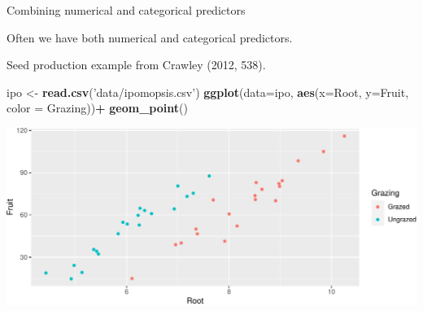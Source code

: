 \documentclass[
  ignorenonframetext,
]{beamer}
\newenvironment{Shaded}{\begin{snugshade}}{\end{snugshade}}
\newcommand{\DataTypeTok}[1]{\textcolor[rgb]{0.13,0.29,0.53}{#1}}
\newcommand{\KeywordTok}[1]{\textcolor[rgb]{0.13,0.29,0.53}{\textbf{#1}}}
\newcommand{\NormalTok}[1]{#1}
\newcommand{\OperatorTok}[1]{\textcolor[rgb]{0.81,0.36,0.00}{\textbf{#1}}}
\newcommand{\StringTok}[1]{\textcolor[rgb]{0.31,0.60,0.02}{#1}}
\begin{document}
\begin{frame}[fragile]{Combining numerical and categorical predictors}
\protect\hypertarget{combining-numerical-and-categorical-predictors}{}

Often we have both numerical and categorical predictors.

Seed production example from Crawley (2012, 538).

\scriptsize

\begin{Shaded}
\begin{Highlighting}[]
\NormalTok{ipo <-}\StringTok{ }\KeywordTok{read.csv}\NormalTok{(}\StringTok{'data/ipomopsis.csv'}\NormalTok{)}
\KeywordTok{ggplot}\NormalTok{(}\DataTypeTok{data=}\NormalTok{ipo, }\KeywordTok{aes}\NormalTok{(}\DataTypeTok{x=}\NormalTok{Root, }\DataTypeTok{y=}\NormalTok{Fruit, }\DataTypeTok{color =}\NormalTok{ Grazing))}\OperatorTok{+}
\StringTok{  }\KeywordTok{geom_point}\NormalTok{()}
\end{Highlighting}
\end{Shaded}

\includegraphics{Regression_and_ANOVA_files/figure-beamer/unnamed-chunk-17-1.pdf}

\end{frame}
\end{document}
